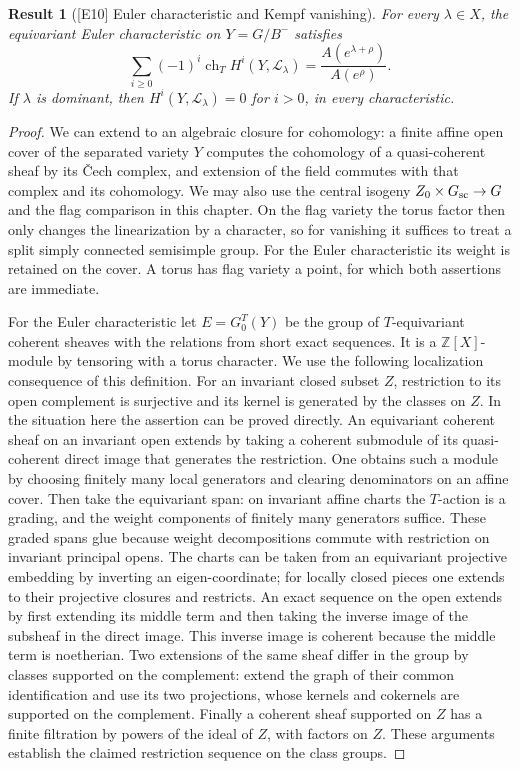 \documentclass[11pt,a4paper,openany,oneside]{book}
\theoremstyle{resultstyle}
\newtheorem{statement}{Result}[chapter]
\newenvironment{result}[2]{\clubpenalty=10000\begin{statement}[\textnormal{[#1]} #2]\leavevmode\label{res:#1}\ignorespaces}{\end{statement}}
\theoremstyle{definition}
\numberwithin{equation}{chapter}
\newcommand{\ZZ}{\mathbb{Z}}
\begin{document}
\begin{result}{E10}{Euler characteristic and Kempf vanishing}
For every \(\lambda\in X\), the equivariant Euler characteristic on \(Y=G/B^-\) satisfies
\[
 \sum_{i\geq0}(-1)^i\operatorname{ch}_T H^i(Y,\mathcal L_\lambda)
 =\frac{A(e^{\lambda+\rho})}{A(e^\rho)} .
\]
If \(\lambda\) is dominant, then \(H^i(Y,\mathcal L_\lambda)=0\) for \(i>0\), in every characteristic.
\end{result}
\begin{proof}
We can extend to an algebraic closure for cohomology: a finite affine open cover of the separated variety \(Y\) computes the cohomology of a quasi-coherent sheaf by its \v{C}ech complex, and extension of the field commutes with that complex and its cohomology. We may also use the central isogeny \(Z_0\times G_{\rm sc}\to G\) and the flag comparison in this chapter. On the flag variety the torus factor then only changes the linearization by a character, so for vanishing it suffices to treat a split simply connected semisimple group. For the Euler characteristic its weight is retained on the cover. A torus has flag variety a point, for which both assertions are immediate.

For the Euler characteristic let \(E=G_0^T(Y)\) be the
group of \(T\)-equivariant coherent sheaves with the relations
from short exact sequences. It is a \(\ZZ[X]\)-module by
tensoring with a torus character. We use the following
localization consequence of this definition. For an invariant
closed subset \(Z\), restriction to its open complement is
surjective and its kernel is generated by the classes on
\(Z\). In the situation here the assertion can be proved
directly. An equivariant coherent sheaf on an invariant
open extends by taking a coherent submodule of its
quasi-coherent direct image that generates the restriction.
One obtains such a module by choosing finitely many local
generators and clearing denominators on an affine cover.
Then take the equivariant span: on invariant affine charts
the \(T\)-action is a grading, and the weight components
of finitely many generators suffice. These graded spans
glue because weight decompositions commute with restriction
on invariant principal opens. The charts can be taken
from an equivariant projective embedding by inverting an
eigen-coordinate; for locally closed pieces one extends to
their projective closures and restricts.
An exact sequence on the open extends by first extending
its middle term and then taking the inverse image of the
subsheaf in the direct image. This inverse image is coherent
because the middle term is noetherian. Two extensions of
the same sheaf differ in the group by classes supported on
the complement: extend the graph of their common
identification and use its two projections, whose kernels
and cokernels are supported on the complement.
Finally a coherent sheaf supported on \(Z\) has a finite
filtration by powers of the ideal of \(Z\), with factors
on \(Z\). These arguments establish the claimed restriction
sequence on the class groups.


\end{proof}
\end{document}
